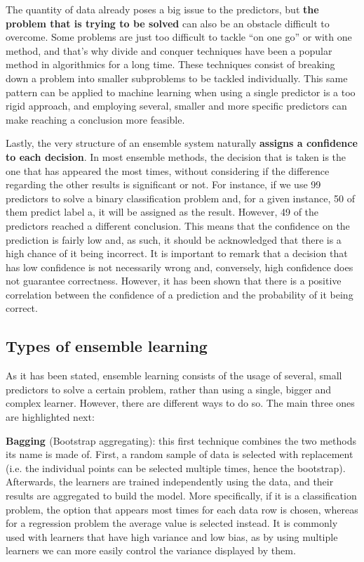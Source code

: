 \documentclass{article}
\begin{document}
The quantity of data already poses a big issue to the predictors, but \textbf{the problem that is trying to be solved} can also be an obstacle difficult to overcome. Some problems are just too difficult to tackle “on one go” or with one method, and that’s why divide and conquer techniques have been a popular method in algorithmics for a long time. These techniques consist of breaking down a problem into smaller subproblems to be tackled individually. This same pattern can be applied to machine learning when using a single predictor is a too rigid approach, and employing several, smaller and more specific predictors can make reaching a conclusion more feasible.

Lastly, the very structure of an ensemble system naturally\textbf{ assigns a confidence to each decision}. In most ensemble methods, the decision that is taken is the one that has appeared the most times, without considering if the difference regarding the other results is significant or not. For instance, if we use 99 predictors to solve a binary classification problem and, for a given instance, 50 of them predict label a, it will be assigned as the result. However, 49 of the predictors reached a different conclusion. This means that the confidence on the prediction is fairly low and, as such, it should be acknowledged that there is a high chance of it being incorrect. It is important to remark that a decision that has low confidence is not necessarily wrong and, conversely, high confidence does not guarantee correctness. However, it has been shown that there is a positive correlation between the confidence of a prediction and the probability of it being correct.

\subsection{Types of ensemble learning}

As it has been stated, ensemble learning consists of the usage of several, small predictors to solve a certain problem, rather than using a single, bigger and complex learner. However, there are different ways to do so. The main three ones are highlighted next:

\textbf{Bagging \cite{IBM}} (Bootstrap aggregating): this first technique combines the two methods its name is made of. First, a random sample of data is selected with replacement (i.e. the individual points can be selected multiple times, hence the bootstrap). Afterwards, the learners are trained independently using the data, and their results are aggregated to build the model. More specifically, if it is a classification problem, the option that appears most times for each data row is chosen, whereas for a regression problem the average value is selected instead. It is commonly used with learners that have high variance and low bias, as by using multiple learners we can more easily control the variance displayed by them. 
\end{document}
